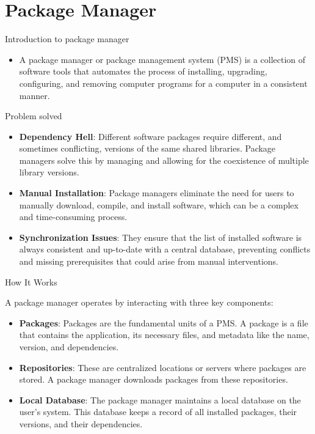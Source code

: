 \section{Package Manager}

\begin{frame}[fragile]{Introduction to package manager}
	\begin{itemize}
		\item A package manager or package management system (PMS) is a collection of software tools that automates the process of installing, upgrading, configuring, and removing computer programs for a computer in a consistent manner.
	\end{itemize}
\end{frame}

\begin{frame}[fragile]{Problem solved}
	\begin{itemize}
		\item \textbf{Dependency Hell}: Different software packages require different, and sometimes conflicting, versions of the same shared libraries. Package managers solve this by managing and allowing for the coexistence of multiple library versions.
		\item \textbf{Manual Installation}: Package managers eliminate the need for users to manually download, compile, and install software, which can be a complex and time-consuming process.
		\item \textbf{Synchronization Issues}: They ensure that the list of installed software is always consistent and up-to-date with a central database, preventing conflicts and missing prerequisites that could arise from manual interventions.
	\end{itemize}
\end{frame}

\begin{frame}[fragile]{How It Works}

	A package manager operates by interacting with three key components:

	\begin{itemize}
		\item \textbf{Packages}: Packages are the fundamental units of a PMS. A package is a file that contains the application, its necessary files, and metadata like the name, version, and dependencies.
		\item \textbf{Repositories}: These are centralized locations or servers where packages are stored. A package manager downloads packages from these repositories.
		\item \textbf{Local Database}: The package manager maintains a local database on the user's system. This database keeps a record of all installed packages, their versions, and their dependencies.
	\end{itemize}
\end{frame}


